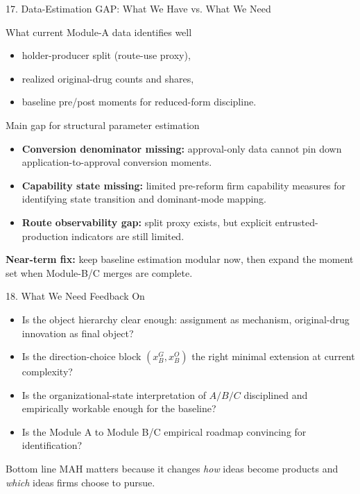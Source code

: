 \documentclass[aspectratio=169,11pt]{beamer}
\begin{document}
\begin{frame}{17. Data-Estimation GAP: What We Have vs. What We Need}
\small
\begin{block}{What current Module-A data identifies well}
\begin{itemize}
    \item holder-producer split (route-use proxy),
    \item realized original-drug counts and shares,
    \item baseline pre/post moments for reduced-form discipline.
\end{itemize}
\end{block}

\begin{block}{Main gap for structural parameter estimation}
\begin{itemize}
    \item \textbf{Conversion denominator missing:} approval-only data cannot pin down application-to-approval conversion moments.
    \item \textbf{Capability state missing:} limited pre-reform firm capability measures for identifying state transition and dominant-mode mapping.
    \item \textbf{Route observability gap:} split proxy exists, but explicit entrusted-production indicators are still limited.
\end{itemize}
\end{block}

\textbf{Near-term fix:} keep baseline estimation modular now, then expand the moment set when Module-B/C merges are complete.
\end{frame}

\begin{frame}{18. What We Need Feedback On}
\begin{itemize}
    \item Is the object hierarchy clear enough: assignment as mechanism, original-drug innovation as final object?
    \item Is the direction-choice block \((x_B^G,x_B^O)\) the right minimal extension at current complexity?
    \item Is the organizational-state interpretation of \(A/B/C\) disciplined and empirically workable enough for the baseline?
    \item Is the Module A to Module B/C empirical roadmap convincing for identification?
\end{itemize}

\vspace{0.35cm}
\begin{block}{Bottom line}
MAH matters because it changes \emph{how} ideas become products and \emph{which} ideas firms choose to pursue.
\end{block}
\end{frame}
\end{document}

